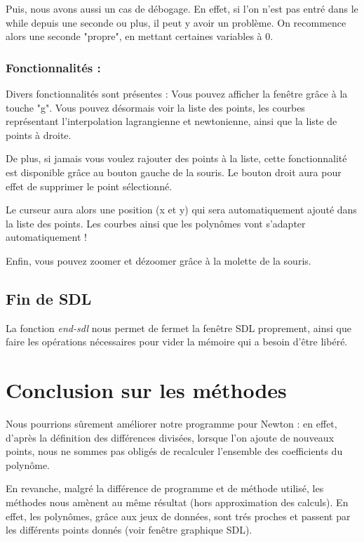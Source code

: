 \documentclass[letter]{article}
\begin{document}
Puis, nous avons aussi un cas de débogage. En effet, si l'on n'est pas entré dans le while depuis une seconde ou plus, il peut y avoir un problème. On recommence alors une seconde "propre", en mettant certaines variables à 0.








\subsubsection{Fonctionnalités :}
\label{sec:org85eb6ea}

Divers fonctionnalités sont présentes :
Vous pouvez afficher la fenêtre grâce à la touche "g". Vous pouvez désormais voir la liste des points, les courbes représentant l'interpolation lagrangienne et newtonienne, ainsi que la liste de points à droite.

De plus, si jamais vous voulez rajouter des points à la liste, cette fonctionnalité est disponible grâce au bouton gauche de la souris. Le bouton droit aura pour effet de supprimer le point sélectionné.

Le curseur aura alors une position (x et y) qui sera automatiquement ajouté dans la liste des points. Les courbes ainsi que les polynômes vont s'adapter automatiquement !


Enfin, vous pouvez zoomer et dézoomer grâce à la molette de la souris.


\subsection{Fin de SDL}
\label{sec:orga3a49ea}

La fonction \emph{end-sdl} nous permet de fermet la fenêtre SDL proprement, ainsi que faire les opérations nécessaires pour vider la mémoire qui a besoin d'être libéré.

\section{Conclusion sur les méthodes}
\label{sec:org61f6bbe}

Nous pourrions sûrement améliorer notre programme pour Newton : en effet, d'après la définition des différences divisées, lorsque l'on ajoute de nouveaux points, nous ne sommes pas obligés de recalculer l'ensemble des coefficients du polynôme.


En revanche, malgré la différence de programme et de méthode utilisé, les méthodes nous amènent au même résultat (hors approximation des calculs). En effet, les polynômes, grâce aux jeux de données, sont trés proches et passent par les différents points donnés (voir fenêtre graphique SDL).
\end{document}
